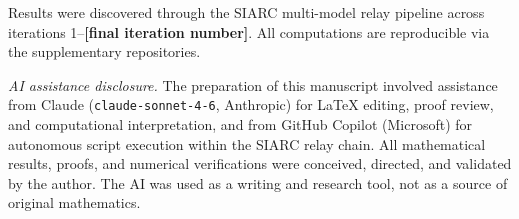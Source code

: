\documentclass[12pt]{amsart}
\newcommand{\PLACEHOLDER}[1]{{\color{red}\textbf{[#1]}}}
\begin{document}
Results were discovered through the SIARC
multi-model relay pipeline across iterations
1--\PLACEHOLDER{final iteration number}.
All computations are reproducible via the
supplementary repositories.

\smallskip
\noindent\textit{AI assistance disclosure.}
The preparation of this manuscript involved
assistance from Claude
(\texttt{claude-sonnet-4-6}, Anthropic) for
\LaTeX{} editing, proof review, and
computational interpretation, and from
GitHub Copilot (Microsoft) for autonomous
script execution within the SIARC relay chain.
All mathematical results, proofs, and
numerical verifications were conceived,
directed, and validated by the author.
The AI was used as a writing and research
tool, not as a source of original mathematics.

\end{document}
